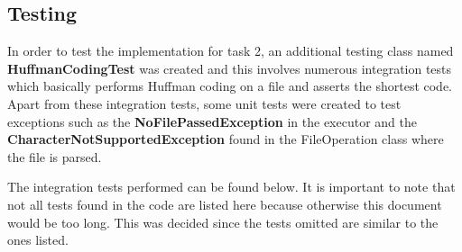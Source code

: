 \documentclass{article}
\begin{document}
		\subsection{Testing}

In order to test the implementation for task 2, an additional testing class named \textbf{HuffmanCodingTest} was created and this involves numerous integration tests which basically performs Huffman coding on a file and asserts the shortest code. Apart from these integration tests, some unit tests  were created to test exceptions such as the \textbf{NoFilePassedException} in the executor and the \textbf{CharacterNotSupportedException} found in the FileOperation class where the file is parsed.

The integration tests performed can be found below. It is important to note that not all tests found in the code are listed here because otherwise this document would be too long. This was decided since the tests omitted are similar to the ones listed.
\end{document}
